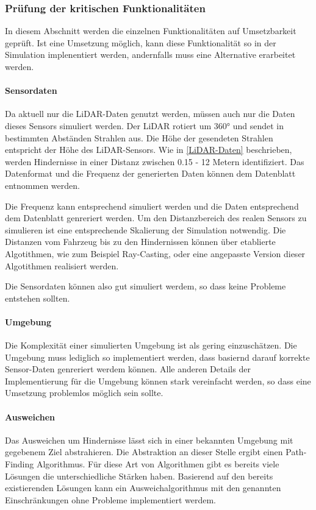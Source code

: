 \subsubsection{Prüfung der kritischen Funktionalitäten}
\label{pr}

In diesem Abschnitt werden die einzelnen Funktionalitäten auf Umsetzbarkeit geprüft. Ist eine Umsetzung möglich, kann diese Funktionalität so in der Simulation implenentiert werden, andernfalls muss eine Alternative erarbeitet werden.

\paragraph{Sensordaten}
Da aktuell nur die LiDAR-Daten genutzt werden, müssen auch nur die Daten dieses Sensors simuliert werden.
Der LiDAR rotiert um 360° und sendet in bestimmten Abständen Strahlen aus. 
Die Höhe der gesendeten Strahlen entspricht der Höhe des LiDAR-Sensors.
Wie in \ref{LiDAR-Daten} beschrieben, werden Hindernisse in einer Distanz zwischen 0.15 - 12 Metern identifiziert. 
Das Datenformat und die Frequenz der generierten Daten können dem Datenblatt \cite{Slamtec2020} entnommen werden.

Die Frequenz kann entsprechend simuliert werden und die Daten entsprechend dem Datenblatt genreriert werden. 
Um den Distanzbereich des realen Sensors zu simulieren ist eine entsprechende Skalierung der Simulation notwendig.
Die Distanzen vom Fahrzeug bis zu den Hindernissen können über etablierte Algotithmen, wie zum Beispiel Ray-Casting, 
oder eine angepasste Version dieser Algotithmen realisiert werden.

Die Sensordaten können also gut simuliert werdem, so dass keine Probleme entstehen sollten.

\paragraph{Umgebung}
Die Komplexität einer simulierten Umgebung ist als gering einzuschätzen.
Die Umgebung muss lediglich so implementiert werden, dass basiernd darauf korrekte Sensor-Daten genreriert werdem können.
Alle anderen Details der Implementierung für die Umgebung können stark vereinfacht werden, so dass eine Umsetzung problemlos möglich sein sollte.

\paragraph{Ausweichen}
Das Ausweichen um Hindernisse lässt sich in einer bekannten Umgebung mit gegebenem Ziel abstrahieren. 
Die Abstraktion an dieser Stelle ergibt einen Path-Finding Algorithmus. 
Für diese Art von Algorithmen gibt es bereits viele Lösungen die unterschiedliche Stärken haben.
Basierend auf den bereits existierenden Lösungen kann ein Ausweichalgorithmus mit den genannten Einschränkungen ohne Probleme implementiert werdem. 
 

